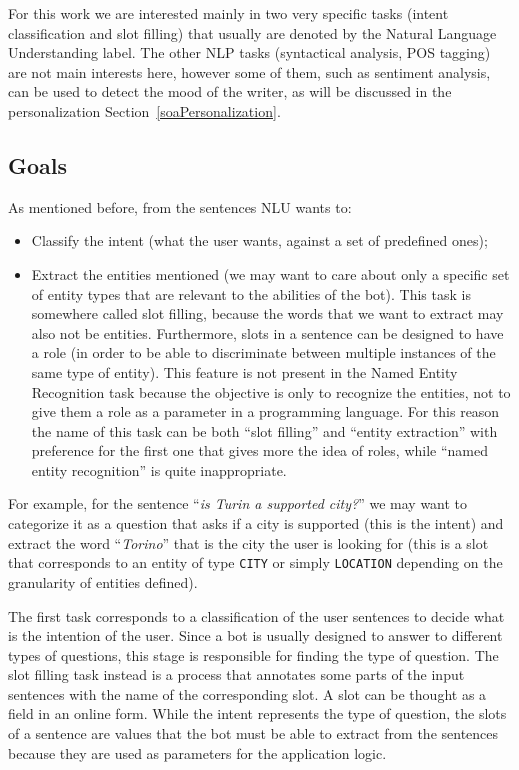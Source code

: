 For this work we are interested mainly in two very specific tasks (intent classification and slot filling) that usually are denoted by the Natural Language Understanding label. The other NLP tasks (syntactical analysis, POS tagging) are not main interests here, however some of them, such as sentiment analysis, can be used to detect the mood of the writer, as will be discussed in the personalization Section~\ref{soaPersonalization}.

\subsection{Goals}
As mentioned before, from the sentences NLU wants to:

\begin{itemize}
	\item Classify the intent (what the user wants, against a set of predefined ones);
	\item Extract the entities mentioned (we may want to care about only a specific set of entity types that are relevant to the abilities of the bot). This task is somewhere called slot filling, because the words that we want to extract may also not be entities.  Furthermore, slots in a sentence can be designed to have a role (in order to be able to discriminate between multiple instances of the same type of entity). This feature is not present in the Named Entity Recognition task because the objective is only to recognize the entities, not to give them a role as a parameter in a programming language. For this reason the name of this task can be both ``slot filling''  and ``entity extraction''  with preference for the first one that gives more the idea of roles, while ``named entity recognition''  is quite inappropriate.
\end{itemize}
For example, for the sentence ``\textit{is Turin a supported city?}'' we may want to categorize it as a question that asks if a city is supported (this is the intent) and extract the word ``\textit{Torino}''  that is the city the user is looking for (this is a slot that corresponds to an entity of type \texttt{CITY} or simply \texttt{LOCATION} depending on the granularity of entities defined).

The first task corresponds to a classification of the user sentences to decide what is the intention of the user. Since a bot is usually designed to answer to different types of questions, this stage is responsible for finding the type of question. The slot filling task instead is a process that annotates some parts of the input sentences with the name of the corresponding slot. A slot can be thought as a field in an online form. While the intent represents the type of question, the slots of a sentence are values that the bot must be able to extract from the sentences because they are used as parameters for the application logic.

